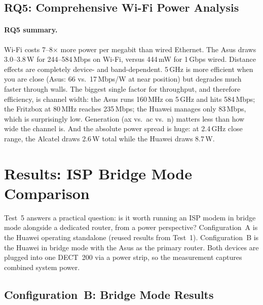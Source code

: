 \subsection{RQ5: Comprehensive Wi-Fi Power Analysis}
\label{sec:results-wifi-rq5}

\paragraph{RQ5 summary.}
Wi-Fi costs 7--8$\times$ more power per megabit than wired Ethernet. The Asus draws 3.0--3.8\,W for 244--584\,Mbps on Wi-Fi, versus 444\,mW for 1\,Gbps wired.
Distance effects are completely device- and band-dependent.
5\,GHz is more efficient when you are close (Asus: 66 vs.\ 17\,Mbps/W at near position) but degrades much faster through walls.
The biggest single factor for throughput, and therefore efficiency, is channel width: the Asus runs 160\,MHz on 5\,GHz and hits 584\,Mbps; the Fritzbox at 80\,MHz reaches 235\,Mbps; the Huawei manages only 83\,Mbps, which is surprisingly low. Generation (ax vs.\ ac vs.\ n) matters less than how wide the channel is.
And the absolute power spread is huge: at 2.4\,GHz close range, the Alcatel draws 2.6\,W total while the Huawei draws 8.7\,W.

\section{Results: \ac{ISP} Bridge Mode Comparison}
\label{sec:results-bridge-mode}

Test~5 answers a practical question: is it worth running an \ac{ISP} modem in bridge mode alongside a dedicated router, from a power perspective? Configuration~A is the Huawei operating standalone (reused results from Test~1). Configuration~B is the Huawei in bridge mode with the Asus as the primary router. Both devices are plugged into one \ac{DECT}~200 via a power strip, so the measurement captures combined system power.

\subsection{Configuration~B: Bridge Mode Results}
\label{sec:results-bridge-config-b}

